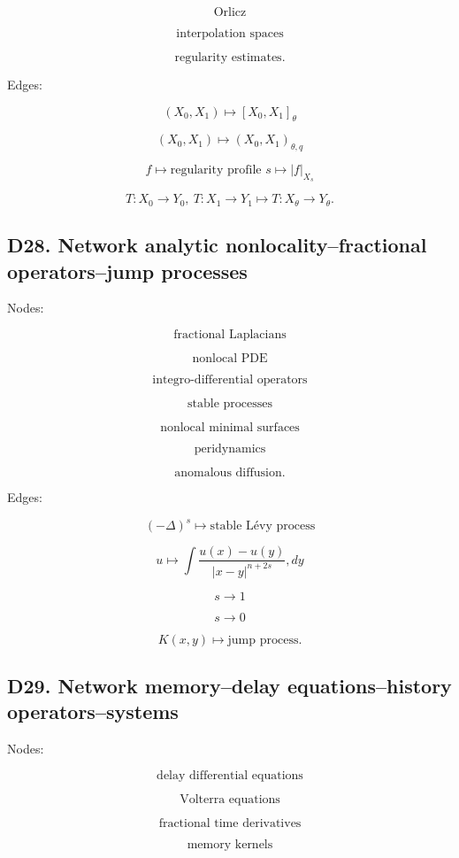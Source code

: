 \documentclass[11pt]{article}
\begin{document}
\[
\text{Orlicz}
\]

\[
\text{interpolation spaces}
\]

\[
\text{regularity estimates}.
\]

Edges:

\[
(X_0,X_1)\mapsto [X_0,X_1]_\theta
\]

\[
(X_0,X_1)\mapsto (X_0,X_1)_{\theta,q}
\]

\[
f\mapsto \text{regularity profile }s\mapsto |f|_{X_s}
\]

\[
T:X_0\to Y_0,\ T:X_1\to Y_1
\mapsto
T:X_\theta\to Y_\theta.
\]



\subsection{D28. Network analytic nonlocality--fractional operators--jump processes}

Nodes:

\[
\text{fractional Laplacians}
\]

\[
\text{nonlocal PDE}
\]

\[
\text{integro-differential operators}
\]

\[
\text{stable processes}
\]

\[
\text{nonlocal minimal surfaces}
\]

\[
\text{peridynamics}
\]

\[
\text{anomalous diffusion}.
\]

Edges:

\[
(-\Delta)^s\mapsto \text{stable Lévy process}
\]

\[
u\mapsto \int\frac{u(x)-u(y)}{|x-y|^{n+2s}},dy
\]

\[
s\to 1
\]

\[
s\to 0
\]

\[
K(x,y)\mapsto \text{jump process}.
\]



\subsection{D29. Network memory--delay equations--history operators--systems}

Nodes:

\[
\text{delay differential equations}
\]

\[
\text{Volterra equations}
\]

\[
\text{fractional time derivatives}
\]

\[
\text{memory kernels}
\]
\end{document}
